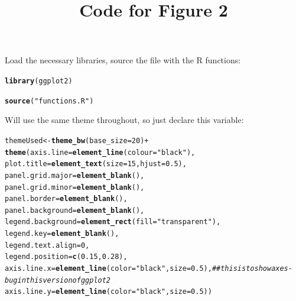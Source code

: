 \documentclass{article}\usepackage[]{graphicx}\usepackage[]{color}
\title{Code for Figure 2}
\makeatletter
\newcommand{\hlnum}[1]{\textcolor[rgb]{0.686,0.059,0.569}{#1}}%
\newcommand{\hlstr}[1]{\textcolor[rgb]{0.192,0.494,0.8}{#1}}%
\newcommand{\hlcom}[1]{\textcolor[rgb]{0.678,0.584,0.686}{\textit{#1}}}%
\newcommand{\hlopt}[1]{\textcolor[rgb]{0,0,0}{#1}}%
\newcommand{\hlstd}[1]{\textcolor[rgb]{0.345,0.345,0.345}{#1}}%
\newcommand{\hlkwb}[1]{\textcolor[rgb]{0.69,0.353,0.396}{#1}}%
\newcommand{\hlkwc}[1]{\textcolor[rgb]{0.333,0.667,0.333}{#1}}%
\newcommand{\hlkwd}[1]{\textcolor[rgb]{0.737,0.353,0.396}{\textbf{#1}}}%
\newenvironment{kframe}{%
 \def\at@end@of@kframe{}%
 \ifinner\ifhmode%
  \def\at@end@of@kframe{\end{minipage}}%
  \begin{minipage}{\columnwidth}%
 \fi\fi%
 \def\FrameCommand##1{\hskip\@totalleftmargin \hskip-\fboxsep
 \colorbox{shadecolor}{##1}\hskip-\fboxsep
     \hskip-\linewidth \hskip-\@totalleftmargin \hskip\columnwidth}%
 \MakeFramed {\advance\hsize-\width
   \@totalleftmargin\z@ \linewidth\hsize
   \@setminipage}}%
 {\par\unskip\endMakeFramed%
 \at@end@of@kframe}
\newenvironment{knitrout}{}{} %
\makeatother
\begin{document}
\maketitle



Load the necessary libraries, source the file with the R functions:
\begin{knitrout}
\color{fgcolor}\begin{kframe}
\begin{alltt}
\hlkwd{library}\hlstd{(ggplot2)}

\hlkwd{source}\hlstd{(}\hlstr{"functions.R"}\hlstd{)}
\end{alltt}
\end{kframe}
\end{knitrout}

Will use the same theme throughout, so just declare this variable:
\begin{knitrout}
\color{fgcolor}\begin{kframe}
\begin{alltt}
\hlstd{themeUsed} \hlkwb{<-} \hlkwd{theme_bw}\hlstd{(}\hlkwc{base_size} \hlstd{=} \hlnum{20}\hlstd{)} \hlopt{+}
  \hlkwd{theme}\hlstd{(}\hlkwc{axis.line} \hlstd{=} \hlkwd{element_line}\hlstd{(}\hlkwc{colour} \hlstd{=} \hlstr{"black"}\hlstd{),}
        \hlkwc{plot.title} \hlstd{=} \hlkwd{element_text}\hlstd{(}\hlkwc{size} \hlstd{=} \hlnum{15}\hlstd{,} \hlkwc{hjust}\hlstd{=}\hlnum{0.5}\hlstd{),}
        \hlkwc{panel.grid.major} \hlstd{=} \hlkwd{element_blank}\hlstd{(),}
        \hlkwc{panel.grid.minor} \hlstd{=} \hlkwd{element_blank}\hlstd{(),}
        \hlkwc{panel.border} \hlstd{=} \hlkwd{element_blank}\hlstd{(),}
        \hlkwc{panel.background} \hlstd{=} \hlkwd{element_blank}\hlstd{(),}
        \hlkwc{legend.background} \hlstd{=} \hlkwd{element_rect}\hlstd{(}\hlkwc{fill}\hlstd{=}\hlstr{"transparent"}\hlstd{),}
        \hlkwc{legend.key} \hlstd{=} \hlkwd{element_blank}\hlstd{(),}
        \hlkwc{legend.text.align} \hlstd{=} \hlnum{0}\hlstd{,}
        \hlkwc{legend.position} \hlstd{=} \hlkwd{c}\hlstd{(}\hlnum{0.15}\hlstd{,}\hlnum{0.28}\hlstd{),}
        \hlkwc{axis.line.x} \hlstd{=} \hlkwd{element_line}\hlstd{(}\hlkwc{color}\hlstd{=}\hlstr{"black"}\hlstd{,} \hlkwc{size} \hlstd{=} \hlnum{0.5}\hlstd{),} \hlcom{##this is to show axes - bug in this version of ggplot2}
        \hlkwc{axis.line.y} \hlstd{=} \hlkwd{element_line}\hlstd{(}\hlkwc{color}\hlstd{=}\hlstr{"black"}\hlstd{,} \hlkwc{size} \hlstd{=} \hlnum{0.5}\hlstd{))}
\end{alltt}
\end{kframe}
\end{knitrout}
\end{document}
